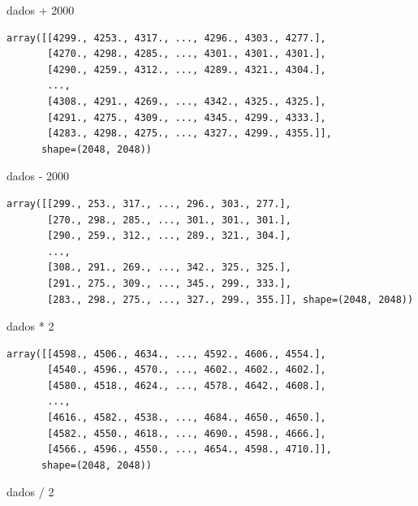 \documentclass[
  letterpaper,
  DIV=11,
  numbers=noendperiod]{scrreprt}
\newenvironment{Shaded}{\begin{snugshade}}{\end{snugshade}}
\newcommand{\DecValTok}[1]{\textcolor[rgb]{0.68,0.00,0.00}{#1}}
\newcommand{\NormalTok}[1]{\textcolor[rgb]{0.00,0.23,0.31}{#1}}
\newcommand{\OperatorTok}[1]{\textcolor[rgb]{0.37,0.37,0.37}{#1}}
\begin{document}
\begin{Shaded}
\begin{Highlighting}[]
\NormalTok{dados }\OperatorTok{+} \DecValTok{2000}
\end{Highlighting}
\end{Shaded}

\begin{verbatim}
array([[4299., 4253., 4317., ..., 4296., 4303., 4277.],
       [4270., 4298., 4285., ..., 4301., 4301., 4301.],
       [4290., 4259., 4312., ..., 4289., 4321., 4304.],
       ...,
       [4308., 4291., 4269., ..., 4342., 4325., 4325.],
       [4291., 4275., 4309., ..., 4345., 4299., 4333.],
       [4283., 4298., 4275., ..., 4327., 4299., 4355.]],
      shape=(2048, 2048))
\end{verbatim}

\begin{Shaded}
\begin{Highlighting}[]
\NormalTok{dados }\OperatorTok{{-}} \DecValTok{2000}
\end{Highlighting}
\end{Shaded}

\begin{verbatim}
array([[299., 253., 317., ..., 296., 303., 277.],
       [270., 298., 285., ..., 301., 301., 301.],
       [290., 259., 312., ..., 289., 321., 304.],
       ...,
       [308., 291., 269., ..., 342., 325., 325.],
       [291., 275., 309., ..., 345., 299., 333.],
       [283., 298., 275., ..., 327., 299., 355.]], shape=(2048, 2048))
\end{verbatim}

\begin{Shaded}
\begin{Highlighting}[]
\NormalTok{dados }\OperatorTok{*} \DecValTok{2}
\end{Highlighting}
\end{Shaded}

\begin{verbatim}
array([[4598., 4506., 4634., ..., 4592., 4606., 4554.],
       [4540., 4596., 4570., ..., 4602., 4602., 4602.],
       [4580., 4518., 4624., ..., 4578., 4642., 4608.],
       ...,
       [4616., 4582., 4538., ..., 4684., 4650., 4650.],
       [4582., 4550., 4618., ..., 4690., 4598., 4666.],
       [4566., 4596., 4550., ..., 4654., 4598., 4710.]],
      shape=(2048, 2048))
\end{verbatim}

\begin{Shaded}
\begin{Highlighting}[]
\NormalTok{dados }\OperatorTok{/} \DecValTok{2}
\end{Highlighting}
\end{Shaded}
\end{document}
